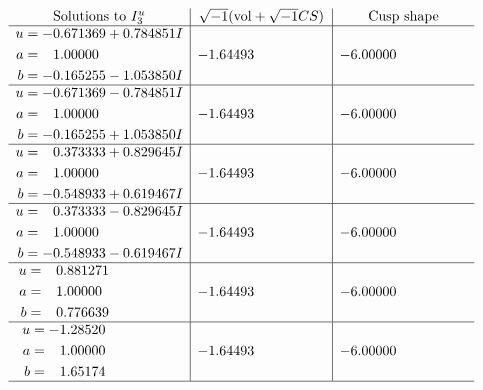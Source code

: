 \documentclass[1p]{elsarticle_modified}
\theoremstyle{definition}
\newcommand{\I}{\sqrt{-1}}
\begin{document}
$$\begin{array}{c|c|c}  
\text{Solutions to }I^u_{3}& \I (\text{vol} + \sqrt{-1}CS) & \text{Cusp shape}\\
 \hline 
\begin{aligned}
u &= -0.671369 + 0.784851 I \\
a &= \phantom{-}1.00000\phantom{ +0.000000I} \\
b &= -0.165255 - 1.053850 I\end{aligned}
 & -1.64493\phantom{ +0.000000I} & -6.00000\phantom{ +0.000000I} \\ \hline\begin{aligned}
u &= -0.671369 - 0.784851 I \\
a &= \phantom{-}1.00000\phantom{ +0.000000I} \\
b &= -0.165255 + 1.053850 I\end{aligned}
 & -1.64493\phantom{ +0.000000I} & -6.00000\phantom{ +0.000000I} \\ \hline\begin{aligned}
u &= \phantom{-}0.373333 + 0.829645 I \\
a &= \phantom{-}1.00000\phantom{ +0.000000I} \\
b &= -0.548933 + 0.619467 I\end{aligned}
 & -1.64493\phantom{ +0.000000I} & -6.00000\phantom{ +0.000000I} \\ \hline\begin{aligned}
u &= \phantom{-}0.373333 - 0.829645 I \\
a &= \phantom{-}1.00000\phantom{ +0.000000I} \\
b &= -0.548933 - 0.619467 I\end{aligned}
 & -1.64493\phantom{ +0.000000I} & -6.00000\phantom{ +0.000000I} \\ \hline\begin{aligned}
u &= \phantom{-}0.881271\phantom{ +0.000000I} \\
a &= \phantom{-}1.00000\phantom{ +0.000000I} \\
b &= \phantom{-}0.776639\phantom{ +0.000000I}\end{aligned}
 & -1.64493\phantom{ +0.000000I} & -6.00000\phantom{ +0.000000I} \\ \hline\begin{aligned}
u &= -1.28520\phantom{ +0.000000I} \\
a &= \phantom{-}1.00000\phantom{ +0.000000I} \\
b &= \phantom{-}1.65174\phantom{ +0.000000I}\end{aligned}
 & -1.64493\phantom{ +0.000000I} & -6.00000\phantom{ +0.000000I}\\
 \hline 
 \end{array}$$\newpage\newpage\renewcommand{\arraystretch}{1}
\end{document}
